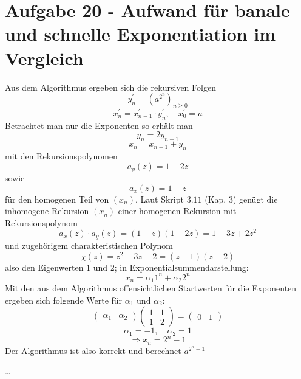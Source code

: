 \section*{Aufgabe 20 - Aufwand für banale und schnelle Exponentiation im
Vergleich}
\begin{flushenum}
\item
  Aus dem Algorithmus ergeben sich die rekursiven Folgen
  \[ y_{n}^{'} = (a^{2^{n}})_{n\geq 0} \]
  \[ x_{n}^{'} = x_{n-1}^{'} \cdot y_{n}^{'}, \quad x_{0}^{'} = a \]
  Betrachtet man nur die Exponenten so erhält man
  \[ y_{n} = 2y_{n-1} \]
  \[ x_{n} = x_{n-1} + y_{n} \]
  mit den Rekursionspolynomen
  \[ a_{y}(z) = 1 - 2z \]
  sowie
  \[ a_{x}(z) = 1 - z \]
  für den homogenen Teil von $(x_{n})$.
  Laut Skript $3.11$ (Kap. $3$) genügt die inhomogene Rekursion $(x_{n})$ einer
  homogenen Rekursion mit Rekursionspolynom
  \[ a_{x}(z) \cdot a_{y}(z) = (1 - z)(1 - 2z) = 1 - 3z + 2z^{2} \]
  und zugehörigem charakteristischen Polynom
  \[ \chi(z)= z^{2} - 3z + 2 = (z - 1)(z - 2) \]
  also den Eigenwerten $1$ und $2$; in Exponentialsummendarstellung:
  \[ x_{n} = \alpha_{1}1^{n} + \alpha_{2}2^{n} \]
  Mit den aus dem Algorithmus offensichtlichen Startwerten für die Exponenten
  ergeben sich folgende Werte für $\alpha_{1}$ und $\alpha_{2}$:
  \[ \begin{pmatrix} \alpha_{1} & \alpha_{2} \end{pmatrix} 
     \begin{pmatrix} 1 & 1 \\ 1 & 2 \end{pmatrix} = \begin{pmatrix} 0 & 1
     \end{pmatrix} \]
  \[ \alpha_{1} = -1, \quad \alpha_{2} = 1 \]
  \[ \Rightarrow x_{n} = 2^{n} - 1 \]
  Der Algorithmus ist also korrekt und berechnet $a^{2^{n}-1}$
\item \dots
\end{flushenum}
